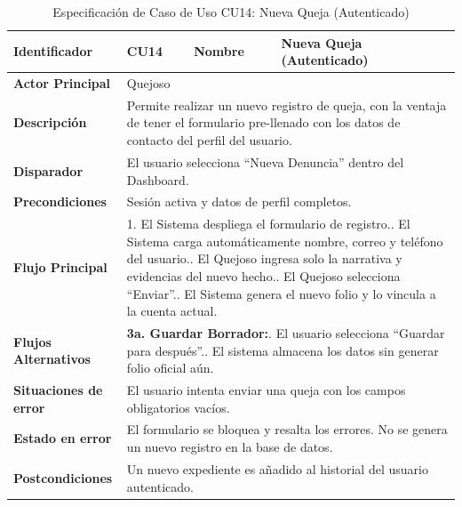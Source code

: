 \begingroup
\setlength{\parskip}{0pt}
\begin{longtable}{|p{3.5cm}|p{2cm}|p{2.5cm}|p{7cm}|}
\caption{Especificación de Caso de Uso CU14: Nueva Queja (Autenticado)}
\label{tab:cu14_nueva_queja} \\
\hline
\textbf{Identificador} & CU14 & \textbf{Nombre} & Nueva Queja (Autenticado) \\ \hline
\textbf{Actor Principal} & \multicolumn{3}{p{11.5cm}|}{Quejoso} \\ \hline
\textbf{Descripción} & \multicolumn{3}{p{11.5cm}|}{Permite realizar un nuevo registro de queja, con la ventaja de tener el formulario pre-llenado con los datos de contacto del perfil del usuario.} \\ \hline
\textbf{Disparador} & \multicolumn{3}{p{11.5cm}|}{El usuario selecciona ``Nueva Denuncia'' dentro del Dashboard.} \\ \hline
\textbf{Precondiciones} & \multicolumn{3}{p{11.5cm}|}{Sesión activa y datos de perfil completos.} \\ \hline
\textbf{Flujo Principal} & \multicolumn{3}{p{11.5cm}|}{1. El Sistema despliega el formulario de registro.\newline 2. El Sistema carga automáticamente nombre, correo y teléfono del usuario.\newline 3. El Quejoso ingresa solo la narrativa y evidencias del nuevo hecho.\newline 4. El Quejoso selecciona ``Enviar''.\newline 5. El Sistema genera el nuevo folio y lo vincula a la cuenta actual.} \\ \hline
\textbf{Flujos Alternativos} & \multicolumn{3}{p{11.5cm}|}{\textbf{3a. Guardar Borrador:}\newline 1. El usuario selecciona ``Guardar para después''.\newline 2. El sistema almacena los datos sin generar folio oficial aún.} \\ \hline
\textbf{Situaciones de error} & \multicolumn{3}{p{11.5cm}|}{El usuario intenta enviar una queja con los campos obligatorios vacíos.} \\ \hline
\textbf{Estado en error} & \multicolumn{3}{p{11.5cm}|}{El formulario se bloquea y resalta los errores. No se genera un nuevo registro en la base de datos.} \\ \hline
\textbf{Postcondiciones} & \multicolumn{3}{p{11.5cm}|}{Un nuevo expediente es añadido al historial del usuario autenticado.} \\ \hline
\end{longtable}
\endgroup

